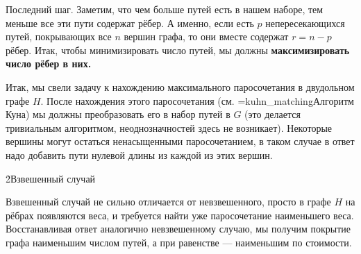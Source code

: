 Последний шаг. Заметим, что чем больше путей есть в нашем наборе, тем меньше все эти пути содержат рёбер. А именно, если есть $p$ непересекающихся путей, покрывающих все $n$ вершин графа, то они вместе содержат $r = n - p$ рёбер. Итак, чтобы минимизировать число путей, мы должны \bf{максимизировать число рёбер} в них.

Итак, мы свели задачу к нахождению максимального паросочетания в двудольном графе $H$. После нахождения этого паросочетания (см. \algohref=kuhn_matching{Алгоритм Куна}) мы должны преобразовать его в набор путей в $G$ (это делается тривиальным алгоритмом, неоднозначностей здесь не возникает). Некоторые вершины могут остаться ненасыщенными паросочетанием, в таком случае в ответ надо добавить пути нулевой длины из каждой из этих вершин.


\h2{Взвешенный случай}

Взвешенный случай не сильно отличается от невзвешенного, просто в графе $H$ на рёбрах появляются веса, и требуется найти уже паросочетание наименьшего веса. Восстанавливая ответ аналогично невзвешенному случаю, мы получим покрытие графа наименьшим числом путей, а при равенстве --- наименьшим по стоимости.